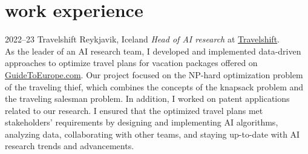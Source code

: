 \section{work experience}
\begin{entrylist}
\entry
{2022--23}
{Travelshift}
{Reykjavik, Iceland}
{\emph{Head of AI research} at \href{https://www.travelshift.com/}{Travelshift}.\\
As the leader of an AI research team, I developed and implemented data-driven approaches to optimize travel plans for vacation packages offered on \href{www.guidetoeurope.com}{GuideTo\-Europe.com}. Our project focused on the NP-hard optimization problem of the traveling thief, which combines the concepts of the knapsack problem and the traveling salesman problem. 
In addition, I worked on patent applications related to our research.
I ensured that the optimized travel plans met stakeholders' requirements by designing and implementing AI algorithms, analyzing data, collaborating with other teams, and staying up-to-date with AI research trends and advancements.}
\end{entrylist}
\clearpage
\removeaside
